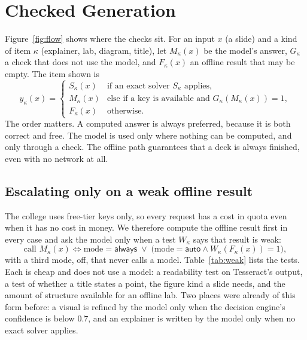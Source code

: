 \documentclass[runningheads]{llncs}
\begin{document}
\section{Checked Generation}
\label{sec:checked}
Figure~\ref{fig:flow} shows where the checks sit. For an input $x$ (a slide) and a kind of item $\kappa$ (explainer, lab,
diagram, title), let $M_\kappa(x)$ be the model's answer, $G_\kappa$ a check that does not use the model, and $F_\kappa(x)$ an
offline result that may be empty. The item shown is
\begin{equation}
\label{eq:checked}
y_\kappa(x) =
\begin{cases}
S_\kappa(x) & \text{if an exact solver } S_\kappa \text{ applies},\\
M_\kappa(x) & \text{else if a key is available and } G_\kappa(M_\kappa(x)) = 1,\\
F_\kappa(x) & \text{otherwise.}
\end{cases}
\end{equation}
The order matters. A computed answer is always preferred, because it is both correct and free. The model is used only where
nothing can be computed, and only through a check. The offline path guarantees that a deck is always finished, even with no
network at all.

\subsection{Escalating only on a weak offline result}
The college uses free-tier keys only, so every request has a cost in quota even when it has no cost in money. We therefore
compute the offline result first in every case and ask the model only when a test $W_\kappa$ says that result is weak:
\begin{equation}
\label{eq:escalate}
\text{call } M_\kappa(x) \iff \text{mode}=\textsf{always} \;\vee\; \bigl(\text{mode}=\textsf{auto} \wedge W_\kappa(F_\kappa(x))=1\bigr),
\end{equation}
with a third mode, \textsf{off}, that never calls a model. Table~\ref{tab:weak} lists the tests. Each is cheap and does not use a
model: a readability test on Tesseract's output, a test of whether a title states a point, the figure kind a slide needs, and
the amount of structure available for an offline lab. Two places were already of this form before: a visual is refined by the
model only when the decision engine's confidence is below $0.7$, and an explainer is written by the model only when no exact
solver applies.
\end{document}
